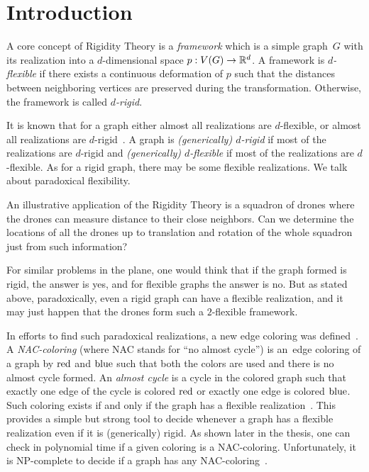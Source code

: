 
\chapter*{Introduction}
\setcounter{page}{1}


A core concept of Rigidity Theory is a \emph{framework} which is
a simple graph~\(G\) with its realization
into a \(d\)-dimensional space \(p: V(G) \to \mathbb{R}^d\).
A framework is \emph{\( d \)-flexible} if there exists
a continuous deformation of \( p \) such that
the distances between neighboring vertices are preserved during the transformation.
Otherwise, the framework is called \emph{\( d \)-rigid}.

It is known that for a graph either almost all realizations are \( d \)-flexible,
or almost all realizations are \( d \)-rigid~\cite{generically_rigid_graphs}.
A graph is \emph{(generically) \( d \)-rigid} if most of the realizations are \( d \)-rigid
and \emph{(generically) \( d \)-flexible} if most of the realizations are \( d \)-flexible.
%
As for a rigid graph,
there may be some flexible realizations.
We talk about paradoxical flexibility.

An illustrative application of the Rigidity Theory is a squadron of drones
where the drones can measure distance to their close neighbors.
Can we determine the locations of all the drones
up to translation and rotation of the whole squadron
just from such information?

For similar problems in the plane,
one would think that if the graph formed is rigid, the answer is yes, and
for flexible graphs the answer is no.
But as stated above, paradoxically, even a rigid graph can have a flexible realization,
and it may just happen that the drones form such a \( 2 \)-flexible framework.

In efforts to find such paradoxical realizations,
a new edge coloring was defined~\cite{legersky_original}.
A \emph{NAC-coloring} (where NAC stands for ``no almost cycle'')
is an~edge coloring of a graph by \( \text{red} \) and \( \text{blue} \)
such that both the colors are used and there is no almost cycle formed.
An \emph{almost cycle} is a cycle in the colored graph such that exactly one
edge of the cycle is colored \( \text{red} \) or exactly one edge is colored \( \text{blue} \).
Such coloring exists if and only if the graph has a flexible realization~\cite{legersky_original}.
This provides a simple but strong tool to decide whenever a graph has
a flexible realization even if it is (generically) rigid.
As shown later in the thesis, one can check in polynomial time
if a given coloring is a NAC-coloring.
Unfortunately, it is NP-complete to decide if a graph has any NAC-coloring~\cite{np_complete}.

